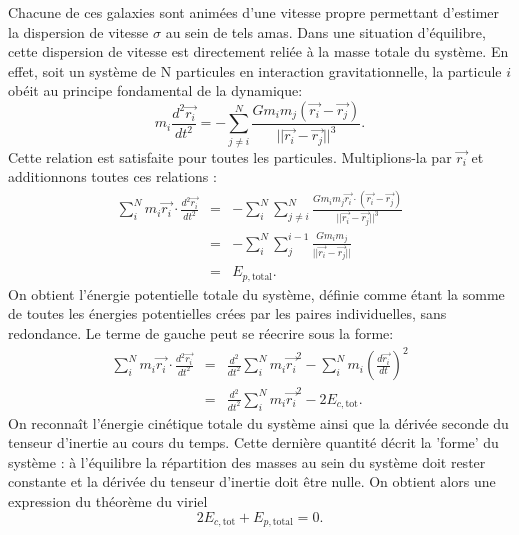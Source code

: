 Chacune de ces galaxies sont animées d'une vitesse propre permettant d'estimer la dispersion de vitesse $\sigma$ au sein de tels amas. Dans une situation d'équilibre, cette dispersion de vitesse est directement reliée à la masse totale du système. En effet, soit un système de N particules en interaction gravitationnelle, la particule $i$ obéit au principe fondamental de la dynamique:
\begin{equation}
m_i\frac{d^2 \vec{r_i}}{dt^2}=-\sum_{j\neq i}^N \frac{Gm_i m_j (\vec{r_i}-\vec{r_j})}{||\vec{r_i}-\vec{r_j}||^3}.
\end{equation}
Cette relation est satisfaite pour toutes les particules. Multiplions-la par $\vec{r_i}$ et additionnons toutes ces relations :
\begin{eqnarray}
\sum_i^N m_i\vec{r_i}\cdot\frac{d^2 \vec{r_i}}{dt^2}&=&-\sum_i^N \sum_{j\neq i}^N \frac{Gm_i m_j \vec{r_i}\cdot (\vec{r_i}-\vec{r_j})}{||\vec{r_i}-\vec{r_j}||^3}\\
&=& -\sum_i^N \sum_j^{i-1}\frac{Gm_i m_j}{||\vec{r_i}-\vec{r_j}||}\\
&=&E_{p,\mathrm{total}}.
\end{eqnarray}
On obtient l'énergie potentielle totale du système, définie comme étant la somme de toutes les énergies potentielles crées par les paires individuelles, sans redondance. Le terme de gauche peut se réecrire sous la forme:
\begin{eqnarray}
\sum_i^N m_i\vec{r_i}\cdot\frac{d^2 \vec{r_i}}{dt^2}&=&\frac{d^2}{dt^2}\sum_i^N m_i \vec{r_i}^2 - \sum_i^N m_i \left(\frac{d \vec{r_i}}{dt}\right)^2\\
&=&\frac{d^2}{dt^2}\sum_i^N m_i \vec{r_i}^2 - 2E_{c,\mathrm{tot}}.
\end{eqnarray}
On reconnaît l'énergie cinétique totale du système ainsi que la dérivée seconde du tenseur d'inertie au cours du temps. Cette dernière quantité décrit la 'forme' du système : à l'équilibre la répartition des masses au sein du système doit rester constante et la dérivée du tenseur d'inertie doit être nulle. On obtient alors une expression du théorème du viriel
\begin{equation}
2E_{c,\mathrm{tot}} + E_{p,\mathrm{total}} =0.
\end{equation}
